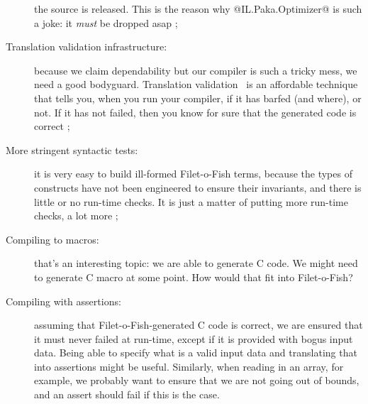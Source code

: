 \begin{description}
  the source is released. This is the reason why @IL.Paka.Optimizer@
  is such a joke: it \emph{must} be dropped asap ;
\item[Translation validation infrastructure:] because we claim
  dependability but our compiler is such a tricky mess, we need a good
  bodyguard. Translation validation~\cite{necula-tvi} is an affordable
  technique that tells you, when you run your compiler, if it has
  barfed (and where), or not. If it has not failed, then you know for
  sure that the generated code is correct ;
\item[More stringent syntactic tests:] it is very easy to build
  ill-formed Filet-o-Fish terms, because the types of constructs have
  not been engineered to ensure their invariants, and there is little
  or no run-time checks. It is just a matter of putting more run-time
  checks, a lot more ;
\item[Compiling to macros:] that's an interesting topic: we are able
  to generate C code. We might need to generate C macro at some
  point. How would that fit into Filet-o-Fish?
\item[Compiling with assertions:] assuming that Filet-o-Fish-generated
  C code is correct, we are ensured that it must never failed at
  run-time, except if it is provided with bogus input data. Being able
  to specify what is a valid input data and translating that into
  assertions might be useful. Similarly, when reading in an array, for
  example, we probably want to ensure that we are not going out of
  bounds, and an assert should fail if this is the case.
\end{description}
